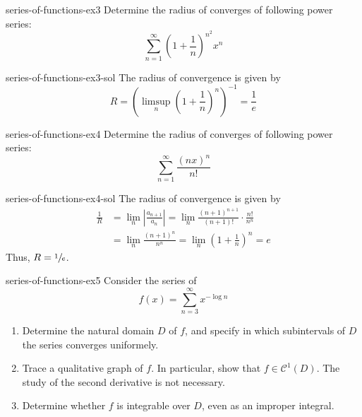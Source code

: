 \documentclass[preview]{standalone}
\begin{document}
\begin{snippetexercise}{series-of-functions-ex3}{}
    Determine the radius of converges of following power series:
    \[
        \sum_{n=1}^\infty \left(
            1 + \frac1n
        \right)^{n^2}x^n
    \]
\end{snippetexercise}

\begin{snippetsolution}{series-of-functions-ex3-sol}{}
    The radius of convergence is given by
    \[
        R = \left(
            \limsup_n \left(1 + \frac1n\right)^n
        \right)^{-1} = \frac{1}{e}
    \]
\end{snippetsolution}

\begin{snippetexercise}{series-of-functions-ex4}{}
    Determine the radius of converges of following power series:
    \[
        \sum_{n=1}^\infty \frac{
            (nx)^n
        }{n!}
    \]
\end{snippetexercise}

\begin{snippetsolution}{series-of-functions-ex4-sol}{}
    The radius of convergence is given by
    \begin{align*}
        \frac1R &= \lim_n \left|\frac{a_{n+1}}{a_n}\right|
        = \lim_n \frac{(n+1)^{n+1}}{(n+1)!} \cdot \frac{n!}{n^n} \\
        &= \lim_n \frac{(n+1)^n}{n^n} = \lim_n \left(1 + \frac1n\right)^n = e
    \end{align*}
    Thus, \(R = \sfrac1e\).
\end{snippetsolution}

\begin{snippetexercise}{series-of-functions-ex5}{}
    Consider the series of \function[functions]
    \[
        f(x) = \sum_{n=3}^\infty x^{-\log n}
    \]
    \begin{enumerate}
        \item Determine the natural domain \(D\) of \(f\), and specify
        in which subintervals of \(D\) the series converges uniformely.
        \item Trace a qualitative graph of \(f\). In particular, show that
        \(f \in \mathcal C^1(D)\). The study of the second derivative is not necessary.
        \item Determine whether \(f\) is integrable over \(D\), even as an improper integral.
    \end{enumerate}
\end{snippetexercise}
\end{document}
